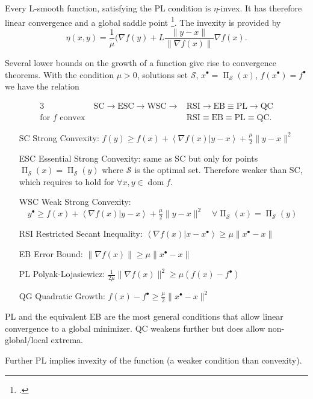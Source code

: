 \documentclass[varwidth=15cm, border=.5cm]{standalone}
\DeclareMathOperator{\proj}{\Pi}
\DeclareMathOperator{\domain}{dom}
\newcommand{\innerp}[2]{\left\langle #1 \vert #2 \right\rangle}
\newcommand{\optimal}[1]{{#1^{\scriptscriptstyle\bullet}}}
\begin{document}
\begin{definition}[label=xt9s0uma, name=Polyak-Lojasiewicz Regularity]
	\begin{remark}[label=z8v9vnod, name=Invexity]
		Every L-smooth function, satisfying the PL condition is
		\(\eta\)-invex. It has therefore linear convergence and a global 
		saddle point \footcite[appendix.A]{barik2023invex}. The invexity is 
		provided by
		\[
			\eta(x,y) = \frac{1}{\mu}(\nabla f(y)+L\frac{\lVert y - x\rVert}{\lVert\nabla f(x)\rVert}\nabla f(x).
		\]
	\end{remark}
\end{definition}

\begin{remark}[label=9wm37o_t, name=Relationship between optimality bounds]
	Several lower bounds on the growth of a function give rise to
	convergence theorems. With the condition \(\mu>0\), solutions set
	\(\mathcal S\), \(\optimal{x} = \proj_{\mathcal S}(x)\), \(f(\optimal{x}) = \optimal{f}\) we 
	have the relation

	\begin{alignat}{3}
		&\text{SC}\to\text{ESC}\to\text{WSC}\to&\text{RSI}\to\text{EB}\equiv\text{PL}\to\text{QC} \\
		\text{for } f \text{ convex}~&&\text{RSI}\equiv\text{EB}\equiv\text{PL}\equiv\text{QC}.
	\end{alignat}

	\begin{enumerate}
		\item[SC] Strong Convexity: \(f(y) \geq f(x) + \innerp{\nabla f(x)}{y-x} + \frac{\mu}{2}\lVert y-x\rVert^2\)
		\item[ESC] Essential Strong Convexity: same as SC but only for
			points \(\proj_\mathcal{S}(x) = \proj_\mathcal{S}(y)\) where \(\mathcal S\) is the optimal 
			set. Therefore weaker than SC, which requires to hold 
			for \(\forall x,y\in\domain{f}\).
		\item[WSC] Weak Strong Convexity: \(\quad\optimal{y} \geq f(x) +
			\innerp{\nabla f(x)}{y-x} + \frac{\mu}{2}\lVert
			y-x\rVert^2 \quad \forall \proj_{\mathcal S}(x) = \proj_{\mathcal S}(y)\)
		\item[RSI] Restricted Secant Inequality: \(\innerp{\nabla
			f(x)}{x-\optimal{x}} \geq \mu\lVert \optimal{x} - x\rVert\)
		\item[EB] Error Bound: \(\lVert\nabla f(x)\rVert \geq \mu\lVert \optimal{x} - x\rVert\)
		\item[PL] Polyak-Lojasiewicz: \(\frac{1}{2\mu}\lVert\nabla f(x)\rVert^2\geq\mu(f(x) - \optimal{f})\)
		\item[QG] Quadratic Growth: \(f(x) - \optimal{f} \geq \frac{\mu}{2}\lVert \optimal{x} - x\lVert^2\)
	\end{enumerate}

	PL and the equivalent EB are the most general conditions that allow
	linear convergence to a global minimizer. QC weakens further but does
	allow non-global/local extrema.

	Further PL implies invexity of the function (a weaker condition than
	convexity). 
\end{remark}
\end{document}
